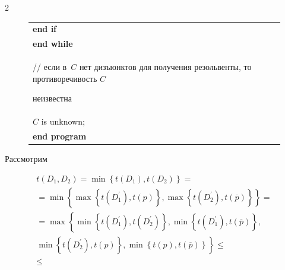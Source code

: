 \begin{multicols}{2}
\begin{figure}[b]
\begin{center}
{\begin{tabular}{|p{118mm}|}
        \hspace*{5mm}\textbf{end if}\\


  \textbf{end while}\\


  {\footnotesize // если в~$C$ нет дизъюнктов для получения резольвенты, то противоречивость $C$ 


неизвестна}\\


   $C$ is unknown;\\


  \textbf{end program}\\


  \hline


  \end{tabular}


  }


  \end{center}




  \end{figure}


  


  Рассмотрим


  \begin{multline*}


  t(D_1,D_2) =\min \left\{ t(D_1), t(D_2)\right\} ={}\\


  {}= \min\left\{ \max \left\{


  t(D_1^\prime), t(p)\right\}, \max \left\{ t(D_2^\prime), 


t(\overline{p})\right\}\right\}={}\\


 {}=


  \max\left\{ \min \left\{ t(D_1^\prime), t(D_2^\prime)\right\}, \min\left\{ 


t(D_1^\prime), t(\overline{p})\right\},\right.\\


\left.


  \min\left\{ t(D_2^\prime), t(p)\right\}, \min \left\{ t(p), 


t(\overline{p})\right\}\right\}\leq{}\\


 {}\leq



\end{multline*}
\end{multicols}
